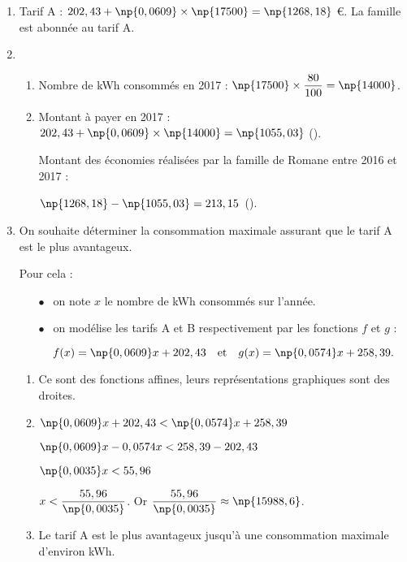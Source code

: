 \documentclass[10pt]{article}
\newcommand{\euro}{\eurologo{}}
\begin{document}
\begin{enumerate}
\item Tarif A : $202,43 + \np{0,0609} \times \np{17500} = \np{1268,18}$ €. La famille est abonnée au tarif A.
\item 
	\begin{enumerate}
		\item Nombre de kWh consommés en 2017 : $\np{17500} \times  \dfrac{80}{100} = \np{14000}$.
		\item Montant à payer en 2017 : $202,43 + \np{0,0609} \times \np{14000} = \np{1055,03}$ (\euro).
		
Montant des économies réalisées par la famille de Romane entre 2016 et 2017 : 
		
		$\np{1268,18} - \np{1055,03} = 213,15$~(\euro).
	\end{enumerate}
\item  On souhaite déterminer la consommation maximale assurant que le tarif A est le plus avantageux.
	
Pour cela :

\setlength\parindent{1cm}
\begin{itemize}
\item[$\bullet~~$] on note $x$ le nombre de kWh consommés sur l'année.
\item[$\bullet~~$] on modélise les tarifs A et B respectivement par les fonctions $f$ et $g$ :

\[f(x) = \np{0,0609}x + 202,43\quad  \text{et}\quad  g(x) = \np{0,0574}x + 258,39.\]

\end{itemize}
\setlength\parindent{0cm}
	\begin{enumerate}
		\item Ce sont des fonctions affines, leurs représentations graphiques sont des droites.
		\item $\np{0,0609}x + 202,43 < \np{0,0574}x + 258,39$
		
$\np{0,0609}x - 0,0574x < 258,39 - 202,43$
		
$\np{0,0035}x < 55,96$

$x < \dfrac{55,96}{\np{0,0035}}$. Or $\dfrac{55,96}{\np{0,0035}} \approx \np{15988,6}$.
		\item Le tarif A est le plus avantageux jusqu'à une consommation maximale d'environ kWh.
	\end{enumerate}
\end{enumerate}

\vspace{0,5cm}
\end{document}
